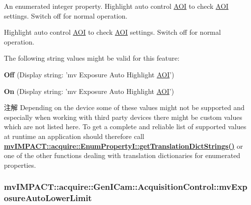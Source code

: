 An enumerated integer property. Highlight auto control \hyperlink{struct_a_o_i}{A\+O\+I} to check \hyperlink{struct_a_o_i}{A\+O\+I} settings. Switch off for normal operation. 

Highlight auto control \hyperlink{struct_a_o_i}{A\+O\+I} to check \hyperlink{struct_a_o_i}{A\+O\+I} settings. Switch off for normal operation.

The following string values might be valid for this feature\+:
\begin{DoxyItemize}
\item {\bfseries Off} (Display string\+: 'mv Exposure Auto Highlight \hyperlink{struct_a_o_i}{A\+O\+I}')
\item {\bfseries On} (Display string\+: 'mv Exposure Auto Highlight \hyperlink{struct_a_o_i}{A\+O\+I}')
\end{DoxyItemize}

\begin{DoxyNote}{注解}
Depending on the device some of these values might not be supported and especially when working with third party devices there might be custom values which are not listed here. To get a complete and reliable list of supported values at runtime an application should therefore call {\bfseries \hyperlink{classmv_i_m_p_a_c_t_1_1acquire_1_1_enum_property_i_a0ba6ccbf5ee69784d5d0b537924d26b6}{mv\+I\+M\+P\+A\+C\+T\+::acquire\+::\+Enum\+Property\+I\+::get\+Translation\+Dict\+Strings()}} or one of the other functions dealing with translation dictionaries for enumerated properties. 
\end{DoxyNote}
\hypertarget{classmv_i_m_p_a_c_t_1_1acquire_1_1_gen_i_cam_1_1_acquisition_control_a20bae36efd152247f4c1c6766a6a681e}{
\subsubsection[{mv\+Exposure\+Auto\+Lower\+Limit}]{ mv\+I\+M\+P\+A\+C\+T\+::acquire\+::\+Gen\+I\+Cam\+::\+Acquisition\+Control\+::mv\+Exposure\+Auto\+Lower\+Limit}}\label{classmv_i_m_p_a_c_t_1_1acquire_1_1_gen_i_cam_1_1_acquisition_control_a20bae36efd152247f4c1c6766a6a681e}


